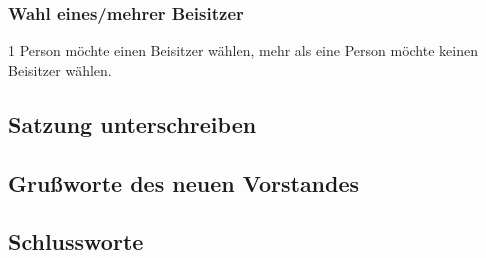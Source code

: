 \documentclass[11pt]{article}
\begin{document}
\subsubsection{Wahl eines/mehrer Beisitzer}
\label{sec-1.7.4}

1 Person möchte einen Beisitzer wählen, mehr als eine Person möchte keinen Beisitzer wählen.

\subsection{Satzung unterschreiben}
\label{sec-1.8}


\subsection{Grußworte des neuen Vorstandes}
\label{sec-1.9}


\subsection{Schlussworte}
\label{sec-1.10}
\end{document}
